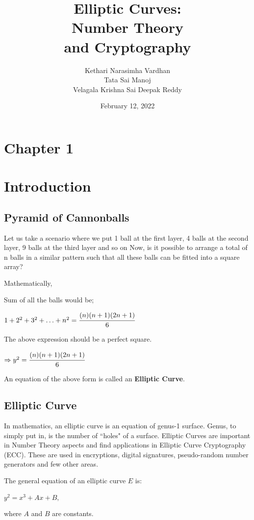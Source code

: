\documentclass[a4paper, 12pt]{article}
\begin{document}
\title{\Huge{\textbf{Elliptic Curves:}\\ Number Theory\\ and Cryptography}}
\author{Kethari Narasimha Vardhan\\ Tata Sai Manoj \\ Velagala Krishna Sai Deepak Reddy}
\date{February 12, 2022}

\maketitle
{}


\section{Chapter 1}
\section*{Introduction}
\subsection{Pyramid of Cannonballs}
Let us take a scenario where we put 1 ball at the first layer, 4 balls at the second layer, 9 balls at the third layer and so on {\dotso}Now, is it possible to arrange a total of n balls in a similar pattern such that all these balls can be fitted into a square array?\par
Mathematically, 
\begin{center}
Sum of all the balls would be; \par$1+2^2+3^2+\dotso+n^2 = \cfrac{(n)(n+1)(2n+1)}{6}$\par
The above expression should be a perfect square.\par
$\Rightarrow y^2 = \cfrac{(n)(n+1)(2n+1)}{6}$
\end{center}
An equation of the above form is called an \textbf{Elliptic Curve}.
\subsection{Elliptic Curve}
In mathematics, an elliptic curve is an equation of genus-1 surface. Genus, to simply put in, is the number of ``holes" of a surface. Elliptic Curves are important in Number Theory aspects and find applications in Elliptic Curve Cryptography (ECC). These are used in encryptions, digital signatures, pseudo-random number generators and few other areas.\par
The general equation of an elliptic curve $E$ is:
\begin{center}
$y^2 = x^3+Ax+B,$
\end{center}
where $A$ and $B$ are constants.
\end{document}

